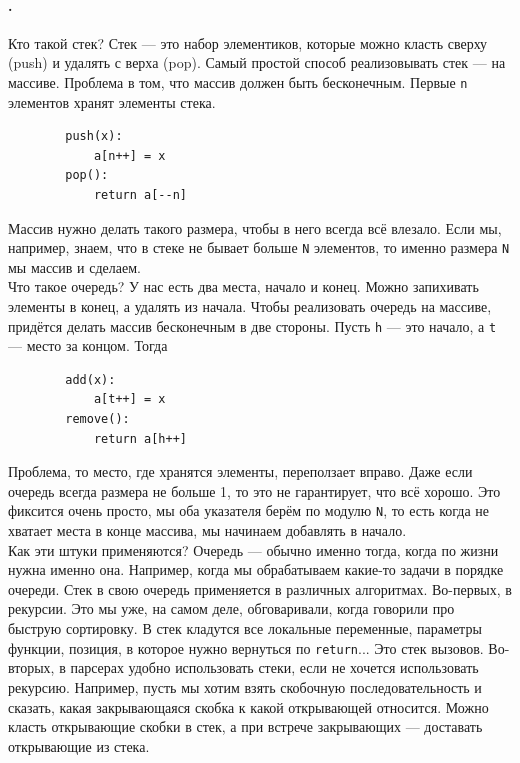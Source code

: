 \documentclass{article}
\newcommand{\pseudo}{PseudoLexer.py:PseudoLexer -x}
\newcommand{\pseudocode}[1]{\texttt{#1}}
\begin{document}
    \paragraph{.}
    Кто такой стек? Стек --- это набор элементиков, которые можно класть сверху (push) и удалять с верха (pop). Самый простой способ реализовывать стек --- на массиве. Проблема в том, что массив должен быть бесконечным. Первые \pseudocode{n} элементов хранят элементы стека.
    \begin{verbatim}
        push(x):
            a[n++] = x
        pop():
            return a[--n]
    \end{verbatim}
    Массив нужно делать такого размера, чтобы в него всегда всё влезало. Если мы, например, знаем, что в стеке не бывает больше \pseudocode{N} элементов, то именно размера \pseudocode{N} мы массив и сделаем.\\
    Что такое очередь? У нас есть два места, начало и конец. Можно запихивать элементы в конец, а удалять из начала. Чтобы реализовать очередь на массиве, придётся делать массив бесконечным в две стороны. Пусть \pseudocode{h} --- это начало, а \pseudocode{t} --- место за концом. Тогда
    \begin{verbatim}
        add(x):
            a[t++] = x
        remove():
            return a[h++]
    \end{verbatim}
    Проблема, то место, где хранятся элементы, переползает вправо. Даже если очередь всегда размера не больше 1, то это не гарантирует, что всё хорошо. Это фиксится очень просто, мы оба указателя берём по модулю \pseudocode{N}, то есть когда не хватает места в конце массива, мы начинаем добавлять в начало.\\
    Как эти штуки применяются? Очередь --- обычно именно тогда, когда по жизни нужна именно она. Например, когда мы обрабатываем какие-то задачи в порядке очереди. Стек в свою очередь применяется в различных алгоритмах. Во-первых, в рекурсии. Это мы уже, на самом деле, обговаривали, когда говорили про быструю сортировку. В стек кладутся все локальные переменные, параметры функции, позиция, в которое нужно вернуться по \texttt{return}... Это стек вызовов. Во-вторых, в парсерах удобно использовать стеки, если не хочется использовать рекурсию. Например, пусть мы хотим взять скобочную последовательность и сказать, какая закрывающаяся скобка к какой открывающей относится. Можно класть открывающие скобки в стек, а при встрече закрывающих --- доставать открывающие из стека.\\
\end{document}
